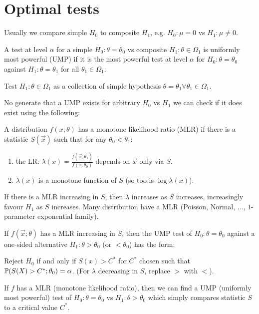 \documentclass[10pt, a4paper]{article}
\begin{document}
\section{Optimal tests}
Usually we compare simple $H_0$ to composite $H_1$,
e.g. $H_0 : \mu = 0$ vs $H_1 : \mu \neq 0$.

\begin{definition}
    A test at level $\alpha$ for a simple $H_0 : \theta = \theta_0$ vs composite $H_1 : \theta \in \Omega_1$ is uniformly most powerful
    (UMP)
    if it is the most powerful test at level $\alpha$ for $H_0 : \theta = \theta_0$ against $H_1 : \theta = \theta_1$ for all $\theta_1 \in \Omega_1$.
\end{definition}
Test $H_1 : \theta \in \Omega_1$ as a collection of simple hypothesis $\theta = \theta_1 \forall \theta_1 \in \Omega_1$.

No generate that a UMP exists for arbitrary $H_0$ vs $H_1$ we can check if it does exist using the following:
\begin{definition}
    A distribution $f(x; \theta)$ has a monotone likelihood ratio
    (MLR)
    if there is a statistic $S(\vec{x})$ such that for any $\theta_0 < \theta_1$:
    \begin{enumerate}[label = (\roman*)]
        \item the LR:
        $\lambda(x) = \frac{f(\vec{x}; \theta_1)}{f(x; \theta_0)}$ depends on $\vec{x}$ only via $S$.

        \item $\lambda(x)$ is a monotone function of $S$
        (so too is $\log{\lambda(x)}$).
    \end{enumerate}
\end{definition}
If there is a MLR increasing in $S$,
then $\lambda$ increases as $S$ increases,
increasingly favour $H_1$ as $S$ increases.
Many distribution have a MLR
(Poisson,
Normal,
$\dotsc$,
$1$-parameter exponential family).

\begin{theorem}
    If $f(\vec{x}; \theta)$ has a MLR increasing in $S$,
    then the UMP test of $H_0 : \theta = \theta_0$ against a one-sided alternative $H_1 : \theta > \theta_0$
    (or $< \theta_0$)
    has the form:
    
    Reject $H_0$ if and only if $S(x) > C ^ {*}$
    for $C ^ {*}$ chosen such that $\P(S(X) > C ^ {*}; \theta_0) = \alpha$.
    (For $\lambda$ decreasing in $S$,
    replace $>$ with $<$).
\end{theorem}
If $f$ has a MLR
(monotone likelihood ratio),
then we can find a UMP
(uniformly most powerful)
test of $H_0 : \theta = \theta_0$ vs $H_1 : \theta > \theta_0$ which simply compares statistic $S$ to a critical value $C ^ {*}$.
\end{document}
